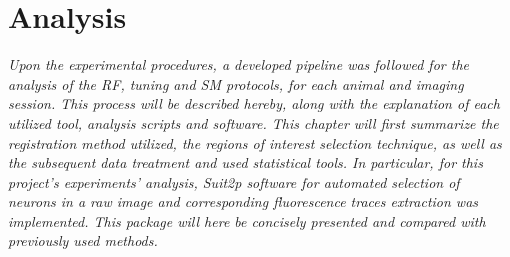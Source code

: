 
\chapter{Analysis}
\label{cap:Analysis}

\textit{Upon the experimental procedures, a developed pipeline was followed for the analysis of the RF, tuning and SM protocols, for each animal and imaging session. This process will be described hereby, along with the explanation of each utilized tool, analysis scripts and software. This chapter will first summarize the registration method utilized, the regions of interest selection technique, as well as the subsequent data treatment and used statistical tools. In particular, for this project's experiments' analysis, Suit2p software for automated selection of neurons in a raw image and corresponding fluorescence traces extraction was implemented. This package will here be concisely presented and compared with previously used methods.}






